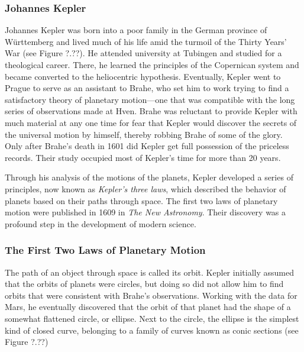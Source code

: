 \documentclass[../../main-astronomy.tex]{subfiles}
\begin{document}
\vspace{1em}

\subsubsection*{Johannes Kepler}

Johannes Kepler was born into a poor family in the German province of W\"{u}rttemberg and lived much of his life amid the turmoil of the Thirty Years' War (see Figure ?.??). He attended university at Tubingen and studied for a theological career. There, he learned the principles of the Copernican system and became converted to the heliocentric hypothesis. Eventually, Kepler went to Prague to serve as an assistant to Brahe, who set him to work trying to find a satisfactory theory of planetary motion---one that was compatible with the long series of observations made at Hven. Brahe was reluctant to provide Kepler with much material at any one time for fear that Kepler would discover the secrets of the universal motion by himself, thereby robbing Brahe of some of the glory. Only after Brahe's death in 1601 did Kepler get full possession of the priceless records. Their study occupied most of Kepler's time for more than 20 years.

\vspace{1em}

Through his analysis of the motions of the planets, Kepler developed a series of principles, now known as \textit{Kepler's three laws}, which described the behavior of planets based on their paths through space. The first two laws of planetary motion were published in 1609 in \textit{The New Astronomy}. Their discovery was a profound step in the development of modern science.


\subsubsection{The First Two Laws of Planetary Motion}

The path of an object through space is called its \gls{orbit}. Kepler initially assumed that the orbits of planets were circles, but doing so did not allow him to find orbits that were consistent with Brahe's observations. Working with the data for Mars, he eventually discovered that the orbit of that planet had the shape of a somewhat flattened circle, or \gls{ellipse}. Next to the circle, the ellipse is the simplest kind of closed curve, belonging to a family of curves known as conic sections (see Figure ?.??)
\end{document}
